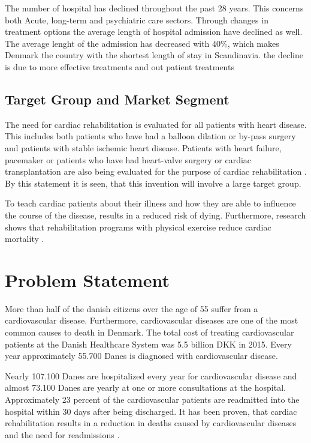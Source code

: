 
The number of hospital has declined throughout the past 28 years. This concerns both Acute, long-term and psychiatric care sectors. Through changes in treatment options the average length of hospital admission have declined as well. The average lenght of the admission has decreased with 40\%, which makes Denmark the country with the shortest length of stay in Scandinavia. the decline is due to more effective treatments and out patient treatments  \cite{DKhealthreview}


\subsection{Target Group and Market Segment}

The need for cardiac rehabilitation is evaluated for all patients with heart disease. This includes both patients who have had a balloon dilation or by-pass surgery and patients with stable ischemic heart disease.
Patients with heart failure, pacemaker or patients who have had heart-valve surgery or cardiac transplantation are also being evaluated for the purpose of cardiac rehabilitation \cite{Rehabilitering}. By this statement it is seen, that this invention will involve a large target group. 

To teach cardiac patients about their illness and how they are able to influence the course of the disease, results in a reduced risk of dying. Furthermore, research shows that rehabilitation programs with physical exercise reduce cardiac mortality \cite{Hjerteforening}.    


\section{Problem Statement}
More than half of the danish citizens over the age of 55 suffer from a cardiovascular disease. Furthermore, cardiovascular diseases are one of the most common causes to death in Denmark. The total cost of treating cardiovascular patients at the Danish Healthcare System was 5.5 billion DKK in 2015. Every year approximately 55.700 Danes is diagnosed with cardiovascular disease.   

Nearly 107.100 Danes are hospitalized every year for cardiovascular disease and almost 73.100 Danes are yearly at one or more consultations at the hospital. Approximately 23 percent of the cardiovascular patients are readmitted into the hospital within 30 days after being discharged. It has been proven, that cardiac rehabilitation results in a reduction in deaths caused by cardiovascular diseases and the need for readmissions \cite{Hjerteforening}.

